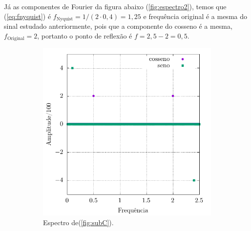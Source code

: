 \documentclass[a4paper, 11pt]{article}
\begin{document}
Já as componentes de Fourier da figura abaixo (\ref{fig:espectro2}), 
temos que (\ref{eq:fnyquist}) é $f_{\text{Nyquist}} = 1/(2\cdot 0,4) = 1,25 $ e frequência original
é a mesma do sinal estudado anteriormente, pois que a componente do cosseno é a mesma, \(
f_{\text{Original}} =  2 \), portanto o ponto de reflexão é \( f = 2,5 - 2 = 0,5 \). 

\begin{figure}[h!]
    \centering
    \caption{Componentes de Fourier para os sinais (\ref{fig:subC}) e (\ref{fig:subD}).}
    \begin{subfigure}{0.45\textwidth}
        \centering
        \includegraphics[width=\textwidth]{output-dft-C}
        \caption{Espectro de(\ref{fig:subC}).}
        \label{fig:espectroC}
    \end{subfigure}
    \hfill
    \begin{subfigure}{0.45\textwidth}
        \centering

\end{subfigure}
\end{figure}
\end{document}

